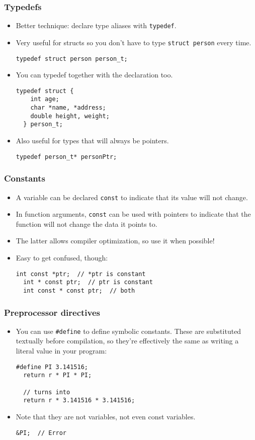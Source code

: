 \begin{frame}[fragile]
  \frametitle{Typedefs}
  \begin{itemize}
  \item Better technique: declare type aliases with \texttt{typedef}.
  \item Very useful for structs so you don't have to type \texttt{struct person}
    every time.
\begin{lstlisting}[style=c]
  typedef struct person person_t;
\end{lstlisting}
  \item You can typedef together with the declaration too.
\begin{lstlisting}[style=c]
  typedef struct {
    int age;
    char *name, *address;
    double height, weight;
  } person_t;
\end{lstlisting}
  \item Also useful for types that will always be pointers.
\begin{lstlisting}[style=c]
  typedef person_t* personPtr;
\end{lstlisting}
  \end{itemize}
\end{frame}

\begin{frame}[fragile]
  \frametitle{Constants}
  \begin{itemize}
  \item A variable can be declared \texttt{const} to indicate that its value
    will not change.
  \item In function arguments, \texttt{const} can be used with pointers to
    indicate that the function will not change the data it points to.
  \item The latter allows compiler optimization, so use it when possible!
  \item Easy to get confused, though:
\begin{lstlisting}[style=c]
  int const *ptr;  // *ptr is constant
  int * const ptr;  // ptr is constant
  int const * const ptr;  // both
\end{lstlisting}
  \end{itemize}
\end{frame}

\begin{frame}[fragile]
  \frametitle{Preprocessor directives}
  \begin{itemize}
  \item You can use \texttt{\#define} to define symbolic constants. These are
    substituted textually before compilation, so they're effectively the same as
    writing a literal value in your program:
\begin{lstlisting}[style=c]
  #define PI 3.141516;
  return r * PI * PI;

  // turns into
  return r * 3.141516 * 3.141516;
\end{lstlisting}
  \item Note that they are not variables, not even const variables.
\begin{lstlisting}[style=c]
  &PI;  // Error
\end{lstlisting}
  \end{itemize}
\end{frame}

